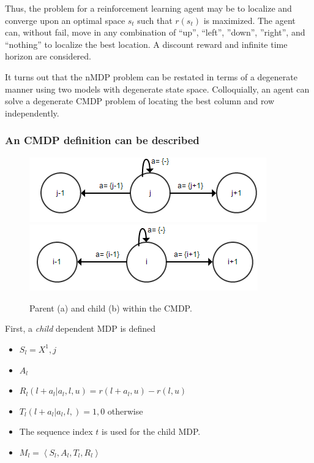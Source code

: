 \documentclass[compsoc,journal,letterpaper,10pt,draftclsnofoot,onecolumn]{IEEEtran}
\begin{document}
Thus, the problem for a reinforcement learning agent may be to localize
and converge upon an optimal space \(s_{t}\) such that \(r(s_{t})\) is
maximized. The agent can, without fail, move in any combination of
``up'', ``left'', ''down'', ''right'', and ``nothing'' to localize the
best location. A discount reward and infinite time horizon are
considered.

It turns out that the nMDP problem can be restated in terms of a
degenerate manner using two models with degenerate state space.
Colloquially, an agent can solve a degenerate CMDP problem of locating
the best column and row independently.

\subsubsection[An CMDP definition can be
described]{ An CMDP definition can be described}\label{an-cmdp-definition-can-be-described}

\begin{figure}
\includegraphics{media/image3.png}\\
\includegraphics{media/image4.png}\\
\caption{\label{fig:figure2} Parent (a) and child (b) within the CMDP.}
\end{figure}

First, a \emph{child} dependent MDP is defined

\begin{itemize}
\item
  \(S_{l}  = X^{1}, j\)
\item
  \(A_{l}\)
\item
  \(R_{l}\left( l + a_{l}|a_{l},l,u \right) = r\left( l + a_{l}, u \right) - r(l,u)\)
\item
  \(T_{l}\left( l + a_{l}|a_{l}, l, \right) = 1, 0\) otherwise
\item
  The sequence index \(t\) is used for the child MDP.
\item
  \(M_{l} = \left\langle S_{l}, A_{l} ,T_{l}, R_{l} \right\rangle\)
\end{itemize}
\end{document}
